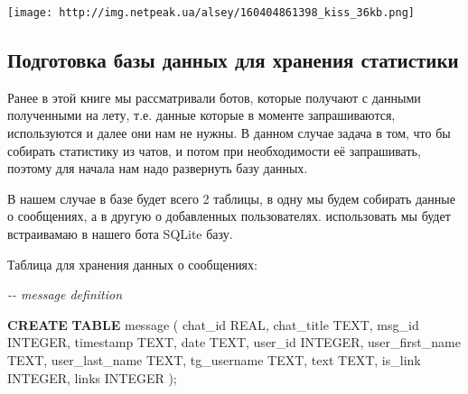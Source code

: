 \documentclass[
]{book}
\newenvironment{Shaded}{\begin{snugshade}}{\end{snugshade}}
\newcommand{\CommentTok}[1]{\textcolor[rgb]{0.56,0.35,0.01}{\textit{#1}}}
\newcommand{\DataTypeTok}[1]{\textcolor[rgb]{0.13,0.29,0.53}{#1}}
\newcommand{\KeywordTok}[1]{\textcolor[rgb]{0.13,0.29,0.53}{\textbf{#1}}}
\newcommand{\NormalTok}[1]{#1}
\begin{document}
\texttt{[image: http://img.netpeak.ua/alsey/160404861398\_kiss\_36kb.png]}

\subsection{Подготовка базы данных для хранения статистики}\label{ux43fux43eux434ux433ux43eux442ux43eux432ux43aux430-ux431ux430ux437ux44b-ux434ux430ux43dux43dux44bux445-ux434ux43bux44f-ux445ux440ux430ux43dux435ux43dux438ux44f-ux441ux442ux430ux442ux438ux441ux442ux438ux43aux438}

Ранее в этой книге мы рассматривали ботов, которые получают с данными полученными на лету, т.е. данные которые в моменте запрашиваются, используются и далее они нам не нужны. В данном случае задача в том, что бы собирать статистику из чатов, и потом при необходимости её запрашивать, поэтому для начала нам надо развернуть базу данных.

В нашем случае в базе будет всего 2 таблицы, в одну мы будем собирать данные о сообщениях, а в другую о добавленных пользователях. использовать мы будет встраивамаю в нашего бота SQLite базу.

Таблица для хранения данных о сообщениях:

\begin{Shaded}
\begin{Highlighting}[]
\CommentTok{{-}{-} message definition}

\KeywordTok{CREATE} \KeywordTok{TABLE}\NormalTok{ \textasciigrave{}message\textasciigrave{} (}
\NormalTok{  \textasciigrave{}chat\_id\textasciigrave{} }\DataTypeTok{REAL}\NormalTok{,}
\NormalTok{  \textasciigrave{}chat\_title\textasciigrave{} TEXT,}
\NormalTok{  \textasciigrave{}msg\_id\textasciigrave{} }\DataTypeTok{INTEGER}\NormalTok{,}
\NormalTok{  \textasciigrave{}timestamp\textasciigrave{} TEXT,}
\NormalTok{  \textasciigrave{}date\textasciigrave{} TEXT,}
\NormalTok{  \textasciigrave{}user\_id\textasciigrave{} }\DataTypeTok{INTEGER}\NormalTok{,}
\NormalTok{  \textasciigrave{}user\_first\_name\textasciigrave{} TEXT,}
\NormalTok{  \textasciigrave{}user\_last\_name\textasciigrave{} TEXT,}
\NormalTok{  \textasciigrave{}tg\_username\textasciigrave{} TEXT,}
\NormalTok{  \textasciigrave{}text\textasciigrave{} TEXT,}
\NormalTok{  \textasciigrave{}is\_link\textasciigrave{} }\DataTypeTok{INTEGER}\NormalTok{,}
\NormalTok{  \textasciigrave{}links\textasciigrave{} }\DataTypeTok{INTEGER}
\NormalTok{);}
\end{Highlighting}
\end{Shaded}
\end{document}
